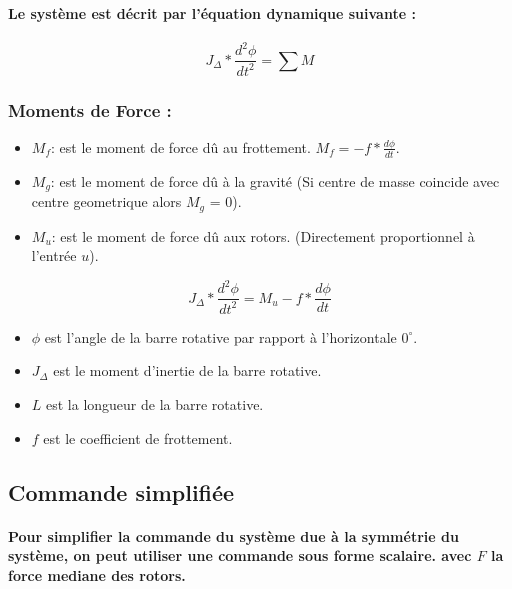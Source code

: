 \paragraph{Le système est décrit par l'équation dynamique suivante :}

\begin{equation}
	J_\Delta * \frac{d^2\phi}{dt^2} = \sum M
\end{equation}

\subsubsection{Moments de Force :}
\begin{itemize}
	\item $M_f$: est le moment de force dû au frottement. $M_f = -f * \frac{d\phi}{dt}$.
	\item $M_g$: est le moment de force dû à la gravité (Si centre de masse coincide avec centre geometrique alors $M_g$ = 0).
	\item $M_{u}$: est le moment de force dû aux rotors. (Directement proportionnel à l'entrée $u$).
\end{itemize}

\begin{equation}
	J_\Delta * \frac{d^2\phi}{dt^2} = M_{u} - f * \frac{d\phi}{dt}
\end{equation}

\begin{itemize}
	\item $\phi$ est l'angle de la barre rotative par rapport à l'horizontale $0^\circ $.
	\item $J_\Delta$ est le moment d'inertie de la barre rotative.
	\item $L$ est la longueur de la barre rotative.
	\item $f$ est le coefficient de frottement.
\end{itemize}

\subsection{Commande simplifiée}

\paragraph{Pour simplifier la commande du système due à la symmétrie du système, on peut utiliser une commande sous forme scalaire. avec $F$ la force mediane des rotors.}
